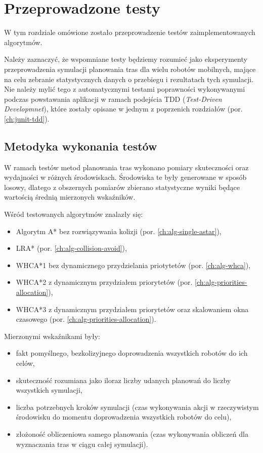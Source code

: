 \chapter{Przeprowadzone testy}
\label{ch:tests}
W tym rozdziale omówione zostało przeprowadzenie testów zaimplementowanych algorytmów.

Należy zaznaczyć, że wspomniane testy będziemy rozumieć jako eksperymenty przeprowadzenia symulacji planowania tras dla wielu robotów mobilnych, mające na celu zebranie statystycznych danych o przebiegu i rezultatach tych symulacji. Nie należy mylić tego z automatycznymi testami poprawności wykonywanymi podczas powstawania aplikacji w ramach podejścia TDD ({\it Test-Driven Developmnet}), które zostały opisane w jednym z poprzenich rozdziałów (por. \ref{ch:junit-tdd}).

\section{Metodyka wykonania testów}
W ramach testów metod planowania tras wykonano pomiary skuteczności oraz wydajności w różnych środowiskach. 
Środowiska te były generowane w sposób losowy, dlatego z obszernych pomiarów zbierano statystyczne wyniki będące wartością średnią mierzonych wskaźników.

Wśród testowanych algorytmów znalazły się:
\begin{itemize}
	\item Algorytm A* bez rozwiązywania kolizji (por. \ref{ch:alg-single-astar}),
	\item LRA* (por. \ref{ch:alg-collision-avoid}),
	\item WHCA*1 bez dynamicznego przydzielania priotytetów (por. \ref{ch:alg-whca}),
	\item WHCA*2 z dynamicznym przydziałem priorytetów (por. \ref{ch:alg-priorities-allocation}),
	\item WHCA*3 z dynamicznym przydziałem priorytetów oraz skalowaniem okna czasowego (por. \ref{ch:alg-priorities-allocation}).
\end{itemize}

Mierzonymi wskaźnikami były:
\begin{itemize}
	\item fakt pomyślnego, bezkolizyjnego doprowadzenia wszystkich robotów do ich celów,
	\item skuteczność rozumiana jako iloraz liczby udanych planowań do liczby wszystkich symulacji,
	\item liczba potrzebnych kroków symulacji (czas wykonywania akcji w rzeczywistym środowisku do momentu doprowadzenia wszystkich robotów do celu),
	\item złożoność obliczeniowa samego planowania (czas wykonywania obliczeń dla wyznaczania tras w ciągu całej symulacji).
\end{itemize}

